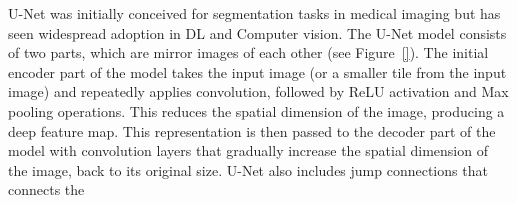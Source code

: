 U-Net was initially conceived for segmentation tasks in medical imaging but has seen widespread adoption in DL and Computer vision.
The U-Net model consists of two parts, which are mirror images of each other (see Figure~\ref{}).
The initial encoder part of the model takes the input image (or a smaller tile from the input image) and repeatedly applies convolution, followed by ReLU activation and Max pooling operations.
This reduces the spatial dimension of the image, producing a deep feature map.
This representation is then passed to the decoder part of the model with convolution layers that gradually increase the spatial dimension of the image, back to its original size.
U-Net also includes jump connections that connects the